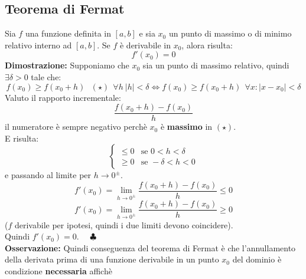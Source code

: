 \documentclass[../../main.tex]{subfiles}
\begin{document}
\subsection{Teorema di Fermat}
Sia $f$ una funzione definita in $[a, b]$ e sia $x_0$ un punto di massimo o di minimo relativo interno ad $[a, b]$.
Se $f$ è derivabile in $x_0$, alora risulta:
\[
    f'(x_0) = 0
\]
\textbf{Dimostrazione:} Supponiamo che $x_0$ sia un punto di massimo relativo, quindi $\exists \delta > 0$ tale che:
\[
    f(x_0) \geq f(x_0 + h) \ \ \ (\star) \ \ \forall h \ |h|<\delta \iff f(x_0)\geq f(x_0 + h) \ \ \forall x: |x-x_0|<\delta
\]
Valuto il rapporto incrementale:
\[
    \dfrac{f(x_0 + h) - f(x_0)}{h}
\]
il numeratore è sempre negativo perchè $x_0$ è \textbf{massimo} in $(\star)$.\\
E risulta:
\[
    \begin{cases}
        \leq 0 & \text{se } 0 < h < \delta  \\
        \geq 0 & \text{se } -\delta < h < 0
    \end{cases}
\]
e passando al limite per $h\to0^{\pm}$.\\
\[f'(x_0) = \lim_{h\to0^{\pm}}\dfrac{f(x_0 + h) - f(x_0)}{h} \leq 0\]
\[f'(x_0) = \lim_{h\to0^{\pm}}\dfrac{f(x_0 + h) - f(x_0)}{h} \geq 0\]
($f$ derivabile per ipotesi, quindi i due limiti devono coincidere).\\
Quindi $f'(x_0) = 0$. \ \ $\clubsuit$\\
\textbf{Osservazione:} Quindi conseguenza del teorema di Fermat è che l'annullamento della derivata prima di una funzione derivabile in un punto $x_0$ del dominio è condizione \textbf{necessaria} affichè
\end{document}
